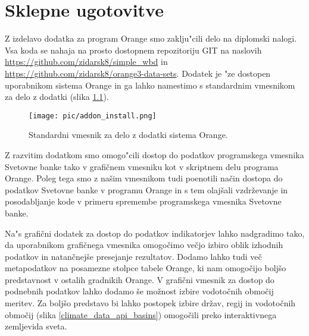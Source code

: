 \chapter{Sklepne ugotovitve}



Z izdelavo dodatka za program Orange smo zaklju"cili delo na diplomski nalogi.
Vsa koda se nahaja na prosto dostopnem repozitoriju GIT na naslovih
\url{https://github.com/zidarsk8/simple_wbd} in
\url{https://github.com/zidarsk8/orange3-data-sets}.
Dodatek je "ze dostopen uporabnikom sistema Orange in ga lahko namestimo s
standardnim vmesnikom za delo z dodatki (slika \ref{addon_install}).



\begin{figure}
\begin{center}
\texttt{[image: pic/addon\_install.png]}
\end{center}
\caption{Standardni vmesnik za delo z dodatki sistema Orange.}
\label{addon_install}
\end{figure} 




Z razvitim dodatkom smo omogo"cili dostop do podatkov programskega vmesnika Svetovne 
banke tako v grafičnem vmesniku kot v skriptnem delu programa Orange. Poleg tega
smo z našim vmesnikom tudi poenotili način dostopa do podatkov Svetovne banke
v programu Orange in s tem olajšali vzdrževanje in posodabljanje kode v
primeru spremembe programskega vmesnika Svetovne banke.



Na"s grafični dodatek za dostop do podatkov indikatorjev lahko nadgradimo tako,
da uporabnikom grafičnega vmesnika omogočimo večjo izbiro oblik izhodnih
podatkov in natančnejše presejanje rezultatov. Dodamo lahko tudi več
metapodatkov na posamezne stolpce tabele Orange, ki nam omogočijo boljšo
predstavnost v ostalih gradnikih Orange. V grafični vmesnik za dostop do
podnebnih podatkov lahko dodamo še možnost izbire vodotočnih območij meritev.
Za boljšo predstavo bi lahko postopek izbire držav, regij in vodotočnih
območij (slika \ref{climate_data_api_basins}) omogočili preko interaktivnega 
zemljevida sveta.

% 
% 
